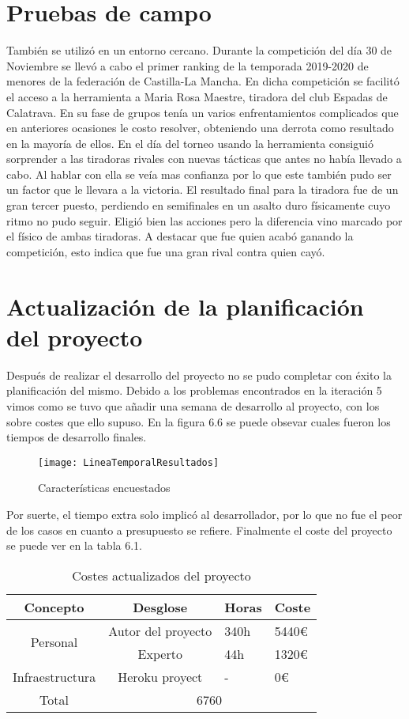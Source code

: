 \section{Pruebas de campo}
También se utilizó en un entorno cercano. Durante la competición del día 30 de Noviembre se llevó
a cabo el primer ranking de la temporada 2019-2020 de menores de la federación de Castilla-La Mancha.
En dicha competición se facilitó el acceso a la herramienta a Maria Rosa Maestre, tiradora del club
Espadas de Calatrava. En su fase de grupos tenía un varios enfrentamientos complicados que en anteriores
ocasiones le costo resolver, obteniendo una derrota como resultado en la mayoría de ellos. En el día
del torneo usando la herramienta consiguió sorprender a las tiradoras rivales con nuevas tácticas que
antes no había llevado a cabo. Al hablar con ella se veía mas confianza por lo que este también
pudo ser un factor que le llevara a la victoria. El resultado final para la tiradora fue de
un gran tercer puesto, perdiendo en semifinales en un asalto duro físicamente cuyo ritmo no pudo
seguir. Eligió bien las acciones pero la diferencia vino marcado por el físico de ambas tiradoras.
A destacar que fue quien acabó ganando la competición, esto indica que fue una gran rival contra
quien cayó.

\section{Actualización de la planificación del proyecto}
Después de realizar el desarrollo del proyecto no se pudo completar con éxito la planificación
del mismo. Debido a los problemas encontrados en la iteración 5 vimos como se tuvo que añadir
una semana de desarrollo al proyecto, con los sobre costes que ello supuso. En la figura 6.6
se puede obsevar cuales fueron los tiempos de desarrollo finales.

\begin{figure}[htb]
  \centering
  \texttt{[image: LineaTemporalResultados]}
  \caption[Características encuestados]{Características encuestados}
  \label{fig:Características encuestados}
\end{figure}

Por suerte, el tiempo extra solo implicó al desarrollador, por lo que no fue el peor de los
casos en cuanto a presupuesto se refiere. Finalmente el coste del proyecto se puede ver en
la tabla 6.1.

\begin{table}[]
  \centering
  \caption{Costes actualizados del proyecto}
  \label{tab:costes actualizados del proyecto}
  \begin{tabular}{|c|c|l|l|}
    \hline
    Concepto & Desglose & Horas & Coste \\ \hline
    \multirow{2}{*}{Personal} & Autor del proyecto & 340h & 5440€ \\ \cline{2-4}
    & Experto & 44h & 1320€ \\ \hline
    Infraestructura & Heroku proyect & - & 0€ \\ \hline
    Total & \multicolumn{3}{c|}{6760} \\ \hline
  \end{tabular}
\end{table}
